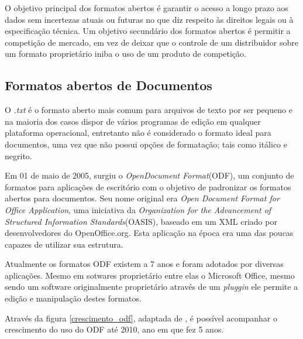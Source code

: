 O objetivo principal dos formatos abertos é garantir o acesso a longo prazo aos dados sem incertezas atuais ou futuras no que diz respeito às direitos legais ou à especificação técnica. Um objetivo secundário dos formatos abertos é permitir a competição de mercado, em vez de deixar que o controle de um distribuidor sobre um formato proprietário iniba o uso de um produto de competição.

\subsection{Formatos abertos de Documentos}
\label{documentos}

O \textit{.txt} é o formato aberto mais comum para arquivos de texto por ser pequeno e na maioria dos casos dispor de vários programas de edição em qualquer plataforma operacional, entretanto não é considerado o formato ideal para documentos, uma vez que não possui opções de formatação; tais como itálico e negrito.

Em 01 de maio de 2005, surgiu o \textit{OpenDocument Format}(ODF), um conjunto de formatos para aplicações de escritório com o objetivo de padronizar os formatos abertos para documentos. Seu nome original era \textit{Open Document Format for Office Application}, uma iniciativa da \textit{Organization for the Advancement of Structured Information Standards}(OASIS), baseado em um XML criado por desenvolvedores do OpenOffice.org. Esta aplicação na época era uma das poucas capazes de utilizar sua estrutura.

Atualmente os formatos ODF existem a 7 anos e foram adotados por diversas aplicações. Mesmo em sotwares proprietário entre elas o Microsoft Office, mesmo sendo um software originalmente proprietário através de um \textit{pluggin} ele permite a edição e manipulação destes formatos.

Através da figura \ref{crescimento_odf}, adaptada de \cite{SILVA}, é possível acompanhar o crescimento do uso do ODF até 2010, ano em que fez 5 anos.

